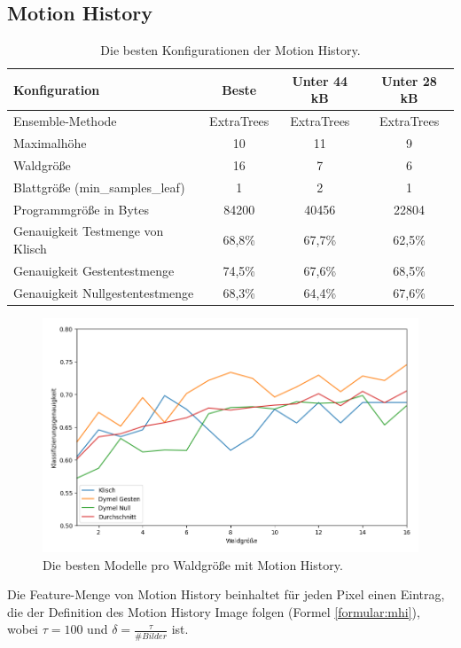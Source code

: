 \subsection{Motion History}
\begin{table}[h!]
    \centering
    \begin{tabular}{ | l | c | c | c |}
        \hline
        Konfiguration & Beste & Unter 44 kB & Unter 28 kB \\\hline
        Ensemble-Methode & ExtraTrees & ExtraTrees & ExtraTrees \\\hline
        Maximalhöhe & 10 & 11 & 9 \\\hline
        Waldgröße & 16 & 7 & 6 \\\hline
        Blattgröße (min\_samples\_leaf) & 1 & 2 & 1 \\\hline
        Programmgröße in Bytes & 84200 & 40456 & 22804 \\\hline
        Genauigkeit Testmenge von Klisch & 68,8\% & 67,7\% & 62,5\% \\\hline
        Genauigkeit Gestentestmenge & 74,5\% & 67,6\% & 68,5\% \\\hline
        Genauigkeit Nullgestentestmenge & 68,3\% & 64,4\% & 67,6\% \\\hline
    \end{tabular}
    \caption{Die besten Konfigurationen der Motion History.}
    \label{tab:motion_history}
\end{table}
\begin{figure}[h!]
    \centering
    \includegraphics[width=\linewidth]{images/motion_history_acc_per_size.png}
    \caption{Die besten Modelle pro Waldgröße mit Motion History.}
    \label{fig:motion_history_per_forest_size}
\end{figure}
Die Feature-Menge von Motion History beinhaltet für jeden Pixel einen Eintrag, die der Definition des Motion History Image folgen (Formel \ref{formular:mhi}), wobei $\tau=100$ und $\delta=\frac{\tau}{\#Bilder}$ ist.
